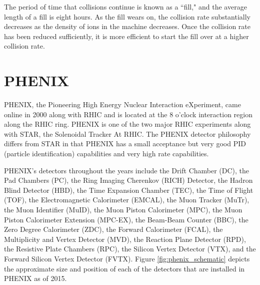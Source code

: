 The period of time that collisions continue is known as a ``fill," and the average length of a fill is eight hours. As the fill wears on, the collision rate substantially decreases as the density of ions in the machine decreases. Once the collision rate has been reduced sufficiently, it is more efficient to start the fill over at a higher collision rate.  


\section{PHENIX}
PHENIX, the Pioneering High Energy Nuclear Interaction eXperiment, came online in 2000 along with RHIC and is located at the 8 o'clock interaction region along the RHIC ring. PHENIX is one of the two major RHIC experiments along with STAR, the Solenoidal Tracker At RHIC. The PHENIX detector philosophy differs from STAR in that PHENIX has a small acceptance but very good PID (particle identification) capabilities and very high rate capabilities. 

PHENIX's detectors throughout the years include the Drift Chamber (DC), the Pad Chambers (PC), the Ring Imaging Cherenkov (RICH) Detector, the Hadron Blind Detector (HBD), the Time Expansion Chamber (TEC), the Time of Flight (TOF), the Electromagnetic Calorimeter (EMCAL), the Muon Tracker (MuTr), the Muon Identifier (MuID), the Muon Piston Calorimeter (MPC), the Muon Piston Calorimeter Extension (MPC-EX), the Beam-Beam Counter (BBC), the Zero Degree Calorimeter (ZDC), the Forward Calorimeter (FCAL), the Multiplicity and Vertex Detector (MVD), the Reaction Plane Detector (RPD), the Resistive Plate Chambers (RPC), the Silicon Vertex Detector (VTX), and the Forward Silicon Vertex Detector (FVTX). Figure \ref{fig:phenix_schematic} depicts the approximate size and position of each of the detectors that are installed in PHENIX as of 2015.

